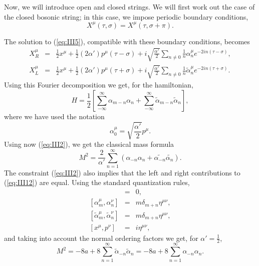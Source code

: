 Now, we will introduce open and closed strings. We will first
work out the case of the closed bosonic string; in this case, we
impose periodic boundary conditions,
\begin{equation}
X^{\mu}(\tau,\sigma)=X^{\mu}(\tau,\sigma+\pi).
\label{eq:III8}
\end{equation}
  
The solution to (\ref{eq:III5}), compatible with these boundary
conditions, becomes
\begin{eqnarray}
X_R^{\mu} & = & \frac {1}{2} x^{\mu} + \frac {1}{2}(2 \alpha')
p^{\mu}(\tau -\sigma) + i \sqrt{\frac {\alpha'}{2}} \sum_{n \neq0}
\frac {1}{n} \alpha_n^{\mu} e^{-2in(\tau-\sigma)}, \nonumber \\
X_L^{\mu} & = & \frac {1}{2} x^{\mu} + \frac {1}{2}(2 \alpha')
p^{\mu}(\tau +\sigma) + i \sqrt{\frac {\alpha'}{2}} \sum_{n \neq0}
\frac {1}{n} \tilde{\alpha}_n^{\mu} e^{-2in(\tau+\sigma)}. 
\label{eq:III9}
\end{eqnarray}
Using this Fourier decomposition we get, for the hamiltonian, 
\begin{equation}
H= \frac {1}{2} \left[ \sum_{- \infty}^{\infty} \alpha_{m-n}
\alpha_n + \sum_{-\infty}^{\infty}
\tilde{\alpha}_{m-n}\tilde{\alpha}_n \right],
\label{eq:III10}
\end{equation}
where we have used the notation
\begin{equation}
\alpha_0^{\mu} = \sqrt{\frac {\alpha'}{2}}p^{\mu}.
\label{eq:III11}
\end{equation}
Using now (\ref{eq:III2}), we get the classical mass formula
\begin{equation}
M^2 = \frac {2}{\alpha'} \sum_{n=1}^{\infty} (\alpha_{-n}
\alpha_n + \tilde{\alpha_{-n}}\tilde{\alpha_n} ).
\label{eq:III12}
\end{equation}
The constraint (\ref{eq:III2}) also implies that the left and
right contributions to (\ref{eq:III12}) are equal. Using the
standard quantization rules,
\begin{eqnarray}
[\alpha_m^{\mu},\tilde{\alpha}_n^{\nu}] & = & 0, \nonumber \\ 
\left[\alpha_m^{\mu},\alpha_n^{\nu}\right]         & = & m \delta_{m+n}\eta^{\mu \nu}, \nonumber \\
\left[\tilde{\alpha}_m^{\mu},\tilde{\alpha}_n^{\nu}\right] & = & m \delta_{m+n}\eta^{\mu \nu}, \nonumber \\
\left[x^{\mu},p^{\nu}\right] & = & i \eta^{\mu \nu},
\label{eq:III13}
\end{eqnarray}
and taking into account the normal ordering factors we get, for
$\alpha'= \frac {1}{2}$,
\begin{equation}
M^2= -8a + 8 \sum_{n=1}^{\infty}
\tilde{\alpha}_{-n}\tilde{\alpha}_n = -8a + 8 \sum_{n=1}^{\infty}
\alpha_{-n} \alpha_n.
\label{eq:III14}
\end{equation}
  

